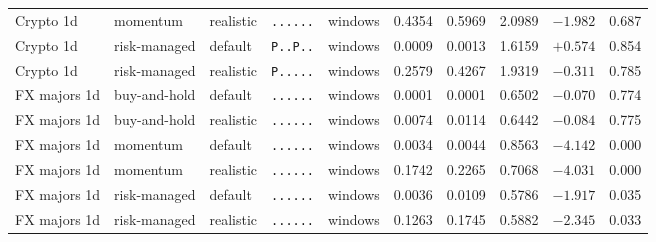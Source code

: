 \begin{table}[t]
\begin{tabular}{lllcccccrr}
Crypto 1d     & momentum     & realistic & \texttt{......} & windows & 0.4354 & 0.5969 & 2.0989 & $-1.982$ & 0.687 \\
Crypto 1d     & risk-managed & default   & \texttt{P..P..} & windows & 0.0009 & 0.0013 & 1.6159 & $+0.574$ & 0.854 \\
Crypto 1d     & risk-managed & realistic & \texttt{P.....} & windows & 0.2579 & 0.4267 & 1.9319 & $-0.311$ & 0.785 \\
\midrule
FX majors 1d  & buy-and-hold & default   & \texttt{......} & windows & 0.0001 & 0.0001 & 0.6502 & $-0.070$ & 0.774 \\
FX majors 1d  & buy-and-hold & realistic & \texttt{......} & windows & 0.0074 & 0.0114 & 0.6442 & $-0.084$ & 0.775 \\
FX majors 1d  & momentum     & default   & \texttt{......} & windows & 0.0034 & 0.0044 & 0.8563 & $-4.142$ & 0.000 \\
FX majors 1d  & momentum     & realistic & \texttt{......} & windows & 0.1742 & 0.2265 & 0.7068 & $-4.031$ & 0.000 \\
FX majors 1d  & risk-managed & default   & \texttt{......} & windows & 0.0036 & 0.0109 & 0.5786 & $-1.917$ & 0.035 \\
FX majors 1d  & risk-managed & realistic & \texttt{......} & windows & 0.1263 & 0.1745 & 0.5882 & $-2.345$ & 0.033 \\
\bottomrule
\end{tabular}
\end{table}

